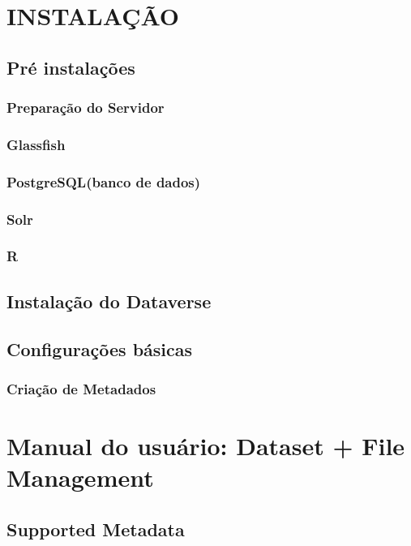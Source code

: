 \documentclass[12pt,hidelinks]{article}
\begin{document}
\newpage

\section{INSTALAÇÃO}
\vspace{10.5cm}

    \subsection{Pré instalações}
        \subsubsection{Preparação do Servidor}
        \subsubsection{Glassfish}
        \subsubsection{PostgreSQL(banco de dados)}
        \subsubsection{Solr}
        \subsubsection{R}
    \subsection{Instalação do Dataverse}
    \subsection{Configurações básicas}
        \subsubsection{Criação de Metadados}
        
\newpage

\section{Manual do usuário: Dataset + File Management}
\vspace{10.5cm}

    \subsection{Supported Metadata}
\end{document}
